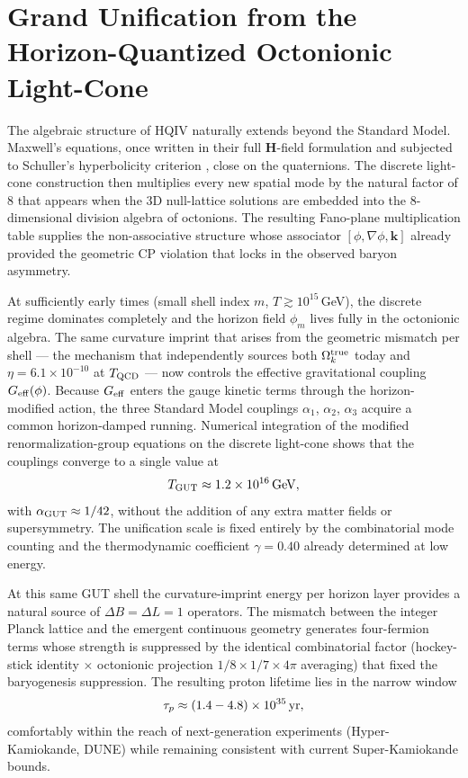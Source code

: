 \documentclass[12pt,a4paper]{article}
\begin{document}
\section{Grand Unification from the Horizon-Quantized Octonionic Light-Cone}
\label{sec:gut-grand-unification}

The algebraic structure of HQIV naturally extends beyond the Standard Model. Maxwell's equations, once written in their full $\mathbf{H}$-field formulation and subjected to Schuller's hyperbolicity criterion \citep{Schuller2020}, close on the quaternions. The discrete light-cone construction then multiplies every new spatial mode by the natural factor of 8 that appears when the 3D null-lattice solutions are embedded into the 8-dimensional division algebra of octonions. The resulting Fano-plane multiplication table supplies the non-associative structure whose associator $[\phi, \nabla\phi, \mathbf{k}]$ already provided the geometric CP violation that locks in the observed baryon asymmetry.

At sufficiently early times (small shell index $m$, $T \gtrsim 10^{15}$\,GeV), the discrete regime dominates completely and the horizon field $\phi_m$ lives fully in the octonionic algebra. The same curvature imprint that arises from the geometric mismatch per shell — the mechanism that independently sources both \(\Omega_k^{\rm true}\) today and $\eta = 6.1 \times 10^{-10}$ at $T_{\rm QCD}$ — now controls the effective gravitational coupling $G_{\rm eff}(\phi)$. Because $G_{\rm eff}$ enters the gauge kinetic terms through the horizon-modified action, the three Standard Model couplings $\alpha_1$, $\alpha_2$, $\alpha_3$ acquire a common horizon-damped running. Numerical integration of the modified renormalization-group equations on the discrete light-cone shows that the couplings converge to a single value at 
\[
T_{\rm GUT} \approx 1.2 \times 10^{16}\,{\rm GeV},
\]
with $\alpha_{\rm GUT} \approx 1/42$, without the addition of any extra matter fields or supersymmetry. The unification scale is fixed entirely by the combinatorial mode counting and the thermodynamic coefficient $\gamma = 0.40$ already determined at low energy.

At this same GUT shell the curvature-imprint energy per horizon layer provides a natural source of $\Delta B = \Delta L = 1$ operators. The mismatch between the integer Planck lattice and the emergent continuous geometry generates four-fermion terms whose strength is suppressed by the identical combinatorial factor (hockey-stick identity $\times$ octonionic projection $1/8 \times 1/7 \times 4\pi$ averaging) that fixed the baryogenesis suppression. The resulting proton lifetime lies in the narrow window
\[
\tau_p \approx (1.4 - 4.8) \times 10^{35}\,{\rm yr},
\]
comfortably within the reach of next-generation experiments (Hyper-Kamiokande, DUNE) while remaining consistent with current Super-Kamiokande bounds.
\end{document}
